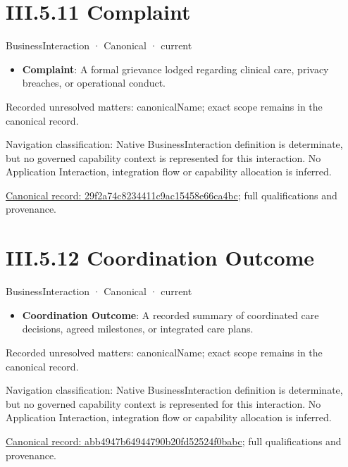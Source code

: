 \section*{III.5.11 Complaint}
\label{navigation:III.5.11}

\label{element:29f2a74c8234411c9ac15458e66ca4bc}
{\small BusinessInteraction · Canonical · current}\par

\begin{itemize}


\item \textbf{Complaint}: A formal grievance lodged regarding clinical care, privacy breaches, or operational conduct.

\end{itemize}

{\small Recorded unresolved matters: canonicalName; exact scope remains in the canonical record.}\par
{\small Navigation classification: Native BusinessInteraction definition is determinate, but no governed capability context is represented for this interaction. No Application Interaction, integration flow or capability allocation is inferred.}\par
{\footnotesize \href{../../../../continuum/business/business-interaction/29f2a74c8234411c9ac15458e66ca4bc.md}{Canonical record: 29f2a74c8234411c9ac15458e66ca4bc}; full qualifications and provenance.}\par
\section*{III.5.12 Coordination Outcome}
\label{navigation:III.5.12}

\label{element:abb4947b64944790b20fd52524f0babc}
{\small BusinessInteraction · Canonical · current}\par

\begin{itemize}


\item \textbf{Coordination Outcome}: A recorded summary of coordinated care decisions, agreed milestones, or integrated care plans.

\end{itemize}

{\small Recorded unresolved matters: canonicalName; exact scope remains in the canonical record.}\par
{\small Navigation classification: Native BusinessInteraction definition is determinate, but no governed capability context is represented for this interaction. No Application Interaction, integration flow or capability allocation is inferred.}\par
{\footnotesize \href{../../../../continuum/business/business-interaction/abb4947b64944790b20fd52524f0babc.md}{Canonical record: abb4947b64944790b20fd52524f0babc}; full qualifications and provenance.}\par
